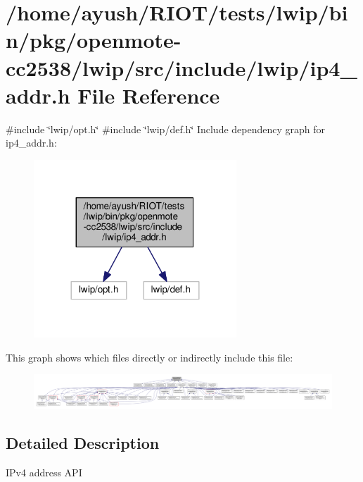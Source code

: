 \hypertarget{openmote-cc2538_2lwip_2src_2include_2lwip_2ip4__addr_8h}{}\section{/home/ayush/\+R\+I\+O\+T/tests/lwip/bin/pkg/openmote-\/cc2538/lwip/src/include/lwip/ip4\+\_\+addr.h File Reference}
\label{openmote-cc2538_2lwip_2src_2include_2lwip_2ip4__addr_8h}
{\ttfamily \#include \char`\"{}lwip/opt.\+h\char`\"{}}\newline
{\ttfamily \#include \char`\"{}lwip/def.\+h\char`\"{}}\newline
Include dependency graph for ip4\+\_\+addr.\+h\+:
\nopagebreak
\begin{figure}[H]
\begin{center}
\leavevmode
\includegraphics[width=216pt]{openmote-cc2538_2lwip_2src_2include_2lwip_2ip4__addr_8h__incl}
\end{center}
\end{figure}
This graph shows which files directly or indirectly include this file\+:
\nopagebreak
\begin{figure}[H]
\begin{center}
\leavevmode
\includegraphics[width=350pt]{openmote-cc2538_2lwip_2src_2include_2lwip_2ip4__addr_8h__dep__incl}
\end{center}
\end{figure}


\subsection{Detailed Description}
I\+Pv4 address A\+PI 